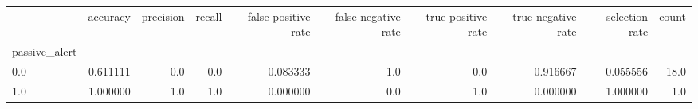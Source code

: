 \begin{tabular}{lrrrrrrrrr}
\toprule
{} &  accuracy &  precision &  recall &  false positive rate &  false negative rate &  true positive rate &  true negative rate &  selection rate &  count \\
passive\_alert &           &            &         &                      &                      &                     &                     &                 &        \\
\midrule
0.0           &  0.611111 &        0.0 &     0.0 &             0.083333 &                  1.0 &                 0.0 &            0.916667 &        0.055556 &   18.0 \\
1.0           &  1.000000 &        1.0 &     1.0 &             0.000000 &                  0.0 &                 1.0 &            0.000000 &        1.000000 &    1.0 \\
\bottomrule
\end{tabular}

